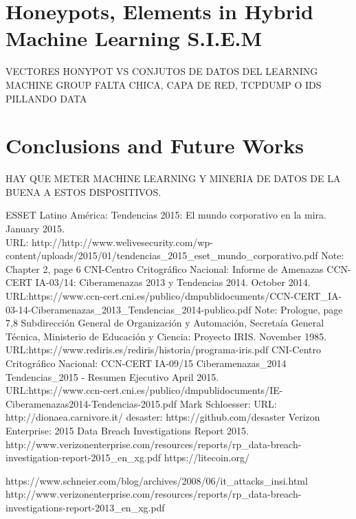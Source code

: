 \documentclass[a4paper]{llncs}
\begin{document}
\section{Honeypots, Elements in Hybrid Machine Learning S.I.E.M}
VECTORES HONYPOT VS CONJUTOS DE DATOS DEL LEARNING MACHINE GROUP
FALTA CHICA, CAPA DE RED, TCPDUMP O IDS PILLANDO DATA

\section{Conclusions and Future Works}
HAY QUE METER MACHINE LEARNING Y MINERIA DE DATOS DE LA BUENA A ESTOS DISPOSITIVOS.

\begin{thebibliography}{5}
ESSET Latino América:
Tendencias 2015: El mundo corporativo en la mira.
January 2015.\\
URL: http://http://www.welivesecurity.com/wp-content/uploads/2015/01/tendencias\_2015\_eset\_mundo\_corporativo.pdf
Note: Chapter 2, page 6
%
CNI-Centro Critográfico Nacional:
Informe de Amenazas CCN-CERT IA-03/14: Ciberamenazas 2013 y Tendencias 2014.
October 2014.\\
URL:https://www.ccn-cert.cni.es/publico/dmpublidocuments/CCN-CERT\_IA-03-14-Ciberamenazas\_2013\_Tendencias\_2014-publico.pdf
Note: Prologue, page 7,8
%
Subdirección General de Organización y Automación, Secretaía General Técnica, Ministerio de Educación y Ciencia:
Proyecto IRIS.
November 1985.\\
URL:https://www.rediris.es/rediris/historia/programa-iris.pdf
%
CNI-Centro Critográfico Nacional:
CCN-CERT IA-09/15 Ciberamenazas\_2014 Tendencias\_2015 - Resumen Ejecutivo
April 2015.\\
URL:https://www.ccn-cert.cni.es/publico/dmpublidocuments/IE-Ciberamenazas2014-Tendencias-2015.pdf
%
Mark Schloesser:
URL: http://dionaea.carnivore.it/
%
desaster:
https://github.com/desaster
%
\bibitem{}
Verizon Enterprise:
2015 Data Breach Investigations Report
2015.\\
http://www.verizonenterprise.com/resources/reports/rp\_data-breach-investigation-report-2015\_en\_xg.pdf
%
https://litecoin.org/
%
\end{thebibliography}
https://www.schneier.com/blog/archives/2008/06/it\_attacks\_insi.html
http://www.verizonenterprise.com/resources/reports/rp\_data-breach-investigations-report-2013\_en\_xg.pdf
\end{document}
